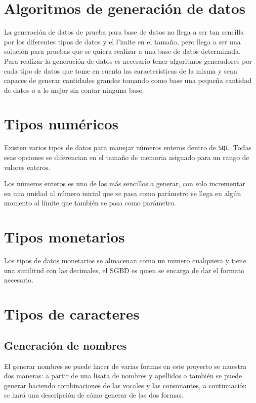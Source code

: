 \section{Algoritmos de generaci\'on de datos}
La generaci\'on de datos de prueba para base de datos no llega a ser tan sencilla por los diferentes tipos de datos y el l'imite en el tama\~no, pero llega a ser una soluci\'on  para pruebas que se quiera realizar a una base de datos determinada. Para realizar la generaci\'on de datos  es necesario tener algoritmos generadores por cada tipo de datos que tome en cuenta las caracter\'isticas de la misma  y sean capaces de generar cantidades grandes tomando como base una peque\~na cantidad de datos o a lo mejor sin contar ninguna base.
\section{Tipos num\'ericos}
Existen varios tipos de datos para manejar n\'umeros enteros dentro de \texttt{SQL}. Todas esas opciones se diferencian en el tama\~no de memoria asignado para un rango de valores enteros.

Los n\'umeros enteros es uno de los m\'as sencillos a generar, con solo incrementar en una unidad al n\'umero  inicial que se pasa como par\'ametro se llega en alg\'un momento al l\'imite que tambi\'en se pasa como par\'ametro.
\section{Tipos monetarios}
Los tipos de datos monetarios se almacenan como un numero cualquiera y tiene una similitud con las decimales, el SGBD es quien se encarga de dar el formato necesario. 
\section{Tipos de caracteres}
\subsection{Generaci\'on de nombres}
El generar nombres se puede hacer de varias formas en este proyecto se muestra dos maneras: a partir de una lisata de nombres y apellidos  o tambi\'en se puede generar haciendo combinaciones de las vocales y las consonantes, a continuaci\'on se har\'a una descripci\'on de c\'omo generar de las dos formas.
